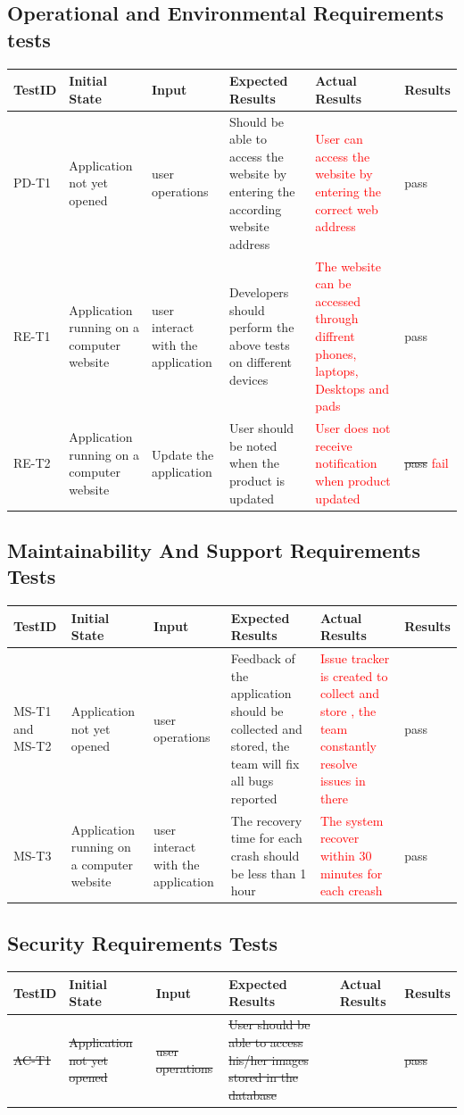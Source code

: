 \documentclass[12pt, oneside, openany, titlepage]{article}
\begin{document}
\subsection{Operational and Environmental Requirements tests}
\begin{tabular}{ |p{1.5cm}| p{2cm} |p{2cm}| p{4cm}|p{3cm}|p{1.5cm}|  }
\hline
 TestID & Initial State & Input & Expected Results & Actual Results&Results\\ 
 \hline
 PD-T1 & Application not yet opened & user operations & Should be able to access the website by entering the according website address &\textcolor{red}{User can access the website by entering the correct web address} & pass\\
 \hline
 RE-T1 & Application running on a computer website & user interact with the application & Developers should perform the above tests on different devices  &\textcolor{red}{The website can be accessed through diffrent phones, laptops, Desktops and pads} & pass\\
 \hline
 RE-T2 & Application running on a computer website & Update the application & User should be noted when the product is updated  & \textcolor{red}{User does not receive notification when product updated} & \sout{pass} \textcolor{red}{fail}\\
 \hline
\end{tabular}
\subsection{Maintainability And Support Requirements Tests}
\begin{tabular}{ |p{1.5cm}| p{2cm} |p{2cm}| p{4cm}|p{3cm}|p{1.5cm}|  }
\hline
 TestID & Initial State & Input & Expected Results & Actual Results&Results\\ 
 \hline
 MS-T1 and MS-T2 & Application not yet opened & user operations & Feedback of the application should be collected and stored, the team will fix all bugs reported &\textcolor{red}{Issue tracker is created to collect and store , the team constantly resolve issues in there} & pass\\
 \hline
 MS-T3 & Application running on a computer website & user interact with the application & The recovery time for each crash should be less than 1 hour  &\textcolor{red}{The system recover within 30 minutes for each creash} &pass\\
 \hline
\end{tabular}
\subsection{Security Requirements Tests}
\begin{tabular}{ |p{1.5cm}| p{2cm} |p{2cm}| p{4cm}|p{3cm}|p{1.5cm}|  }
\hline
 TestID & Initial State & Input & Expected Results & Actual Results&Results\\ 
 \hline
 \sout{AC-T1} & \sout{Application not yet opened} & \sout{user operations} & \sout{User should be able to access his/her images stored in the database} & & \sout{pass}\\
 \hline
\end{tabular}
\end{document}
